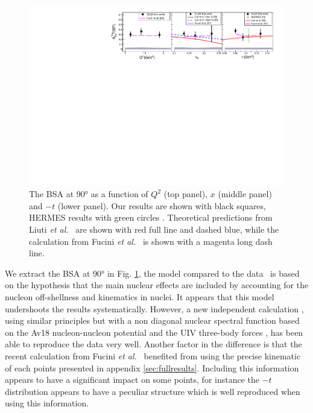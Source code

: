 \documentclass[aps,prc,preprint,superscriptaddress]{revtex4}
\begin{document}
\begin{figure}[tbp]
\center
\includegraphics[width=17cm]{fig3/Coherent_ALU_phi_90.pdf}
\caption{The BSA at 90° as a function of $Q^2$ (top panel), $x$ (middle panel) and $-t$ (lower panel).
	Our results are shown with black squares, HERMES results 
	with green circles \cite{Airapetian:2009cga}. Theoretical predictions 
	from Liuti {\it et al.}~\cite{Liuti:2005gi,GonzalezHernandez:2012jv} are shown 
	with red full line and dashed blue, while the calculation from Fucini 
	{\it et al.}~\cite{Fucini:2018gso} is shown with a magenta long dash line.}
\label{fig:CohALU90}
\end{figure}

We extract the BSA at 90° in Fig. \ref{fig:CohALU90}, the model compared to the 
data~\cite{Liuti:2005gi} is based on the hypothesis that the main nuclear effects are 
included by accounting for the nucleon off-shellness and kinematics in nuclei. It 
appears that this model undershoots the results systematically. However, a new independent 
calculation \cite{Fucini:2018gso}, using similar principles but with a non diagonal nuclear spectral 
function \cite{Viviani:2001wu} based on the Av18 nucleon-nucleon potential \cite{Wiringa:1994wb} 
and the UIV three-body forces \cite{Pudliner:1995wk}, has been able to reproduce the data very 
well. Another factor in the difference is that the recent calculation from Fucini {\it et 
al.}~\cite{Fucini:2018gso} benefited from using the precise kinematic of each points presented 
in appendix \ref{sec:fullresults}. Including this information appears to have a significant 
impact on some points, for instance the $-t$ distribution appears to have a peculiar structure 
which is well reproduced when using this information. 
\end{document}
